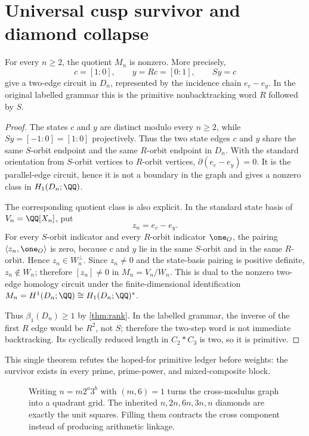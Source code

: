 \section{Universal cusp survivor and diamond collapse}
\label{sec:cusp}

\begin{theorem}
\label{thm:cusp}
For every $n\ge2$, the quotient $M_n$ is nonzero.  More precisely,
\[
  c=[1:0],\qquad y=Rc=[0:1],\qquad Sy=c
\]
give a two-edge circuit in $D_n$, represented by the incidence chain
$e_c-e_y$.  In the original labelled grammar this is the primitive
nonbacktracking word $R$ followed by $S$.
\end{theorem}

\begin{proof}
The states $c$ and $y$ are distinct modulo every $n\ge2$, while
$Sy=[-1:0]=[1:0]$ projectively.  Thus the two state edges $c$ and $y$ share
the same $S$-orbit endpoint and the same $R$-orbit endpoint in $D_n$.  With
the standard orientation from $S$-orbit vertices to $R$-orbit vertices,
$\partial(e_c-e_y)=0$.  It is the parallel-edge circuit, hence it is not a
boundary in the graph and gives a nonzero class in $H_1(D_n;\QQ)$.

The corresponding quotient class is also explicit.  In the standard state
basis of $V_n=\QQ[X_n]$, put
\[
  z_n=e_c-e_y .
\]
For every $S$-orbit indicator and every $R$-orbit indicator $\one_O$, the
pairing $\langle z_n,\one_O\rangle$ is zero, because $c$ and $y$ lie in the
same $S$-orbit and in the same $R$-orbit.  Hence $z_n\in W_n^\perp$.  Since
$z_n\ne0$ and the state-basis pairing is positive definite, $z_n\notin W_n$;
therefore $[z_n]\ne0$ in $M_n=V_n/W_n$.  This is dual to the nonzero
two-edge homology circuit under the finite-dimensional identification
$M_n=H^1(D_n;\QQ)\cong H_1(D_n;\QQ)^*$.

Thus $\beta_1(D_n)\ge1$ by \cref{thm:rank}.  In the labelled grammar, the
inverse of the first $R$ edge would be $R^2$, not $S$; therefore the two-step
word is not immediate backtracking.  Its cyclically reduced length in
$C_2*C_3$ is two, so it is primitive.
\end{proof}

This single theorem refutes the hoped-for primitive ledger before weights:
the survivor exists in every prime, prime-power, and mixed-composite block.

\begin{figure}[t]
  \centering
  
  \caption{Writing $n=m2^a3^b$ with $(m,6)=1$ turns the cross-modulus graph
  into a quadrant grid.  The inherited $n,2n,6n,3n,n$ diamonds are exactly
  the unit squares.  Filling them contracts the cross component instead of
  producing arithmetic linkage.}
  \label{fig:grid}
\end{figure}

